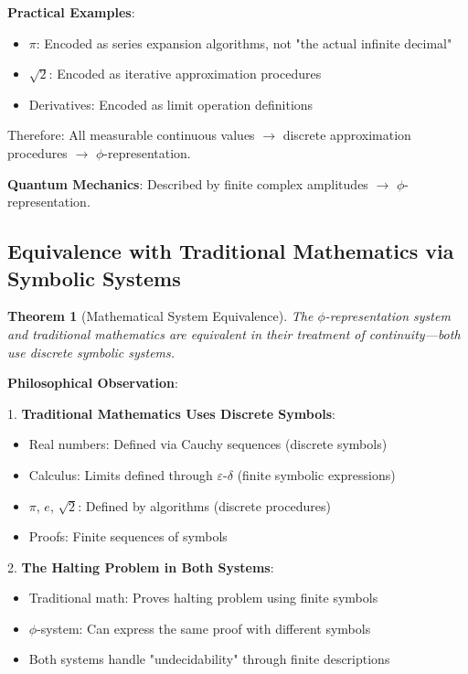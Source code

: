 \documentclass[12pt,letterpaper]{article}
\newtheorem{theorem}{Theorem}[section]
\begin{document}
\textbf{Practical Examples}:
\begin{itemize}
\item $\pi$: Encoded as series expansion algorithms, not "the actual infinite decimal"
\item $\sqrt{2}$: Encoded as iterative approximation procedures
\item Derivatives: Encoded as limit operation definitions
\end{itemize}

Therefore: All measurable continuous values $\to$ discrete approximation procedures $\to$ $\phi$-representation.

\textbf{Quantum Mechanics}: Described by finite complex amplitudes $\to$ $\phi$-representation.

\subsection{Equivalence with Traditional Mathematics via Symbolic Systems}

\begin{theorem}[Mathematical System Equivalence]
The $\phi$-representation system and traditional mathematics are equivalent in their treatment of continuity—both use discrete symbolic systems.
\end{theorem}

\textbf{Philosophical Observation}:

1. \textbf{Traditional Mathematics Uses Discrete Symbols}:
   \begin{itemize}
   \item Real numbers: Defined via Cauchy sequences (discrete symbols)
   \item Calculus: Limits defined through $\varepsilon$-$\delta$ (finite symbolic expressions)
   \item $\pi$, $e$, $\sqrt{2}$: Defined by algorithms (discrete procedures)
   \item Proofs: Finite sequences of symbols
   \end{itemize}

2. \textbf{The Halting Problem in Both Systems}:
   \begin{itemize}
   \item Traditional math: Proves halting problem using finite symbols
   \item $\phi$-system: Can express the same proof with different symbols
   \item Both systems handle "undecidability" through finite descriptions
   \end{itemize}
\end{document}
